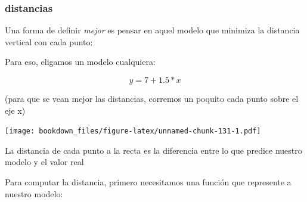 \documentclass[]{book}
\newenvironment{Shaded}{\begin{snugshade}}{\end{snugshade}}
\newcommand{\DataTypeTok}[1]{\textcolor[rgb]{0.13,0.29,0.53}{#1}}
\newcommand{\DecValTok}[1]{\textcolor[rgb]{0.00,0.00,0.81}{#1}}
\newcommand{\FloatTok}[1]{\textcolor[rgb]{0.00,0.00,0.81}{#1}}
\newcommand{\KeywordTok}[1]{\textcolor[rgb]{0.13,0.29,0.53}{\textbf{#1}}}
\newcommand{\NormalTok}[1]{#1}
\newcommand{\OperatorTok}[1]{\textcolor[rgb]{0.81,0.36,0.00}{\textbf{#1}}}
\newcommand{\StringTok}[1]{\textcolor[rgb]{0.31,0.60,0.02}{#1}}
\begin{document}
\hypertarget{distancias}{%
\subsubsection{distancias}\label{distancias}}

Una forma de definir \emph{mejor} es pensar en aquel modelo que minimiza la distancia vertical con cada punto:

Para eso, eligamos un modelo cualquiera:

\[ y= 7 + 1.5*x\]

(para que se vean mejor las distancias, corremos un poquito cada punto sobre el eje x)

\begin{Shaded}
\end{Shaded}

\texttt{[image: bookdown\_files/figure-latex/unnamed-chunk-131-1.pdf]}

La distancia de cada punto a la recta es la diferencia entre lo que predice nuestro modelo y el valor real

Para computar la distancia, primero necesitamos una función que represente a nuestro modelo:
\end{document}
